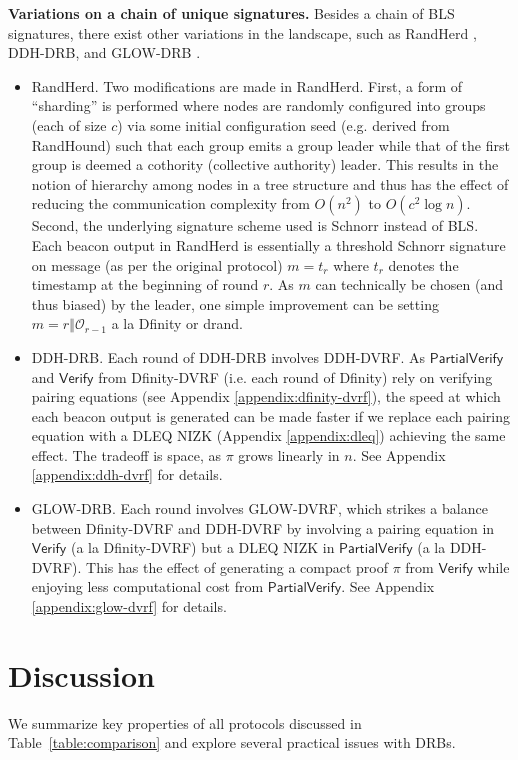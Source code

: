 \documentclass[conference]{IEEEtran}
\theoremstyle{definition}
\theoremstyle{remark}
\begin{document}
\noindent\textbf{Variations on a chain of unique signatures.} Besides a chain of BLS signatures, there exist other variations in the landscape, such as RandHerd \cite{syta2017scalable}, DDH-DRB, and GLOW-DRB \cite{galindo2020fully}.
\begin{itemize}
\item RandHerd. Two modifications are made in RandHerd. First, a form of ``sharding'' is performed where nodes are randomly configured into groups (each of size $c$) via some initial configuration seed (e.g. derived from RandHound) such that each group emits a group leader while that of the first group is deemed a cothority (collective authority) leader. This results in the notion of hierarchy among nodes in a tree structure and thus has the effect of reducing the communication complexity from $O(n^2)$ to $O(c^2 \log n)$. Second, the underlying signature scheme used is Schnorr instead of BLS. Each beacon output in RandHerd is essentially a threshold Schnorr signature on message (as per the original protocol) $m = t_r$ where $t_r$ denotes the timestamp at the beginning of round $r$. As $m$ can technically be chosen (and thus biased) by the leader, one simple improvement can be setting $m = r \mathbin\Vert \mathcal{O}_{r - 1}$ a la Dfinity or drand.
\item DDH-DRB. Each round of DDH-DRB involves DDH-DVRF. As $\mathsf{PartialVerify}$ and $\mathsf{Verify}$ from Dfinity-DVRF (i.e. each round of Dfinity) rely on verifying pairing equations (see Appendix \ref{appendix:dfinity-dvrf}), the speed at which each beacon output is generated can be made faster if we replace each pairing equation with a DLEQ NIZK (Appendix \ref{appendix:dleq}) achieving the same effect. The tradeoff is space, as $\pi$ grows linearly in $n$. See Appendix \ref{appendix:ddh-dvrf} for details.
\item GLOW-DRB. Each round involves GLOW-DVRF, which strikes a balance between Dfinity-DVRF and DDH-DVRF by involving a pairing equation in $\mathsf{Verify}$ (a la Dfinity-DVRF) but a DLEQ NIZK in $\mathsf{PartialVerify}$ (a la DDH-DVRF). This has the effect of generating a compact proof $\pi$ from $\mathsf{Verify}$ while enjoying less computational cost from $\mathsf{PartialVerify}$. See Appendix \ref{appendix:glow-dvrf} for details.
\end{itemize}

\section{Discussion}
\label{section:discussion}
We summarize key properties of all protocols discussed in Table~\ref{table:comparison} and explore several practical issues with DRBs.
\end{document}
